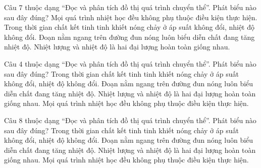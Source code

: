 \begin{ex}
Câu 7 thuộc dạng “Đọc và phân tích đồ thị quá trình chuyển thể”. Phát biểu nào sau đây đúng?
\choice
{Mọi quá trình nhiệt học đều không phụ thuộc điều kiện thực hiện.}
{\True Trong thời gian chất kết tinh tinh khiết nóng chảy ở áp suất không đổi, nhiệt độ không đổi.}
{Đoạn nằm ngang trên đường đun nóng luôn biểu diễn chất đang tăng nhiệt độ.}
{Nhiệt lượng và nhiệt độ là hai đại lượng hoàn toàn giống nhau.}
\end{ex}

\begin{ex}
Câu 4 thuộc dạng “Đọc và phân tích đồ thị quá trình chuyển thể”. Phát biểu nào sau đây đúng?
\choice
{\True Trong thời gian chất kết tinh tinh khiết nóng chảy ở áp suất không đổi, nhiệt độ không đổi.}
{Đoạn nằm ngang trên đường đun nóng luôn biểu diễn chất đang tăng nhiệt độ.}
{Nhiệt lượng và nhiệt độ là hai đại lượng hoàn toàn giống nhau.}
{Mọi quá trình nhiệt học đều không phụ thuộc điều kiện thực hiện.}
\end{ex}

\begin{ex}
Câu 8 thuộc dạng “Đọc và phân tích đồ thị quá trình chuyển thể”. Phát biểu nào sau đây đúng?
\choice
{\True Trong thời gian chất kết tinh tinh khiết nóng chảy ở áp suất không đổi, nhiệt độ không đổi.}
{Đoạn nằm ngang trên đường đun nóng luôn biểu diễn chất đang tăng nhiệt độ.}
{Nhiệt lượng và nhiệt độ là hai đại lượng hoàn toàn giống nhau.}
{Mọi quá trình nhiệt học đều không phụ thuộc điều kiện thực hiện.}
\end{ex}
